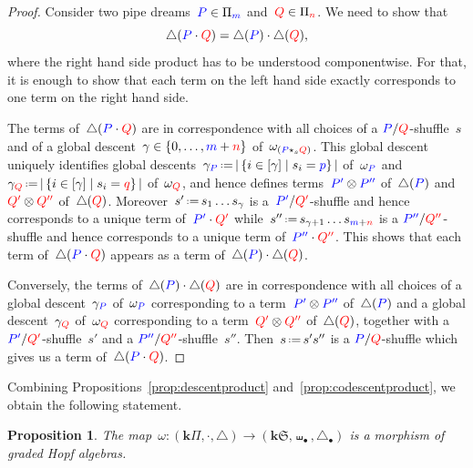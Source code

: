 \documentclass{amsart}
\newtheorem{proposition}[theorem]{Proposition}
\theoremstyle{definition}
\newcommand{\bk}{\mathbf{k}} %
\newcommand{\set}[2]{\left\{ #1 \;\middle|\; #2 \right\}} %
\newcommand{\eqdef}{\mbox{\,\raisebox{0.2ex}{\scriptsize\ensuremath{\mathrm:}}\ensuremath{=}\,}} %
\renewcommand{\b}[1]{{\color{blue} #1}} %
\renewcommand{\r}[1]{{\color{red} #1}} %
\newcommand{\fS}{\mathfrak{S}} %
\newcommand{\gdproduct}{\bullet} %
\newcommand{\gdshuffle}{\shuffle_\gdproduct} %
\newcommand{\gddeconcat}{\coproduct_\gdproduct} %
\newcommand{\HS}{{\bk\fS}} %
\newcommand{\pipeDreams}{\Pi} %
\newcommand{\HP}{{\bk\pipeDreams}} %
\newcommand{\product}{\cdot} %
\newcommand{\coproduct}{\triangle} %
\begin{document}
\begin{proof}
Consider two pipe dreams~$\b{P} \in \pipeDreams_\b{m}$ and~$\r{Q} \in \pipeDreams_\r{n}$. We need to show that
\[
\coproduct(\b{P}\product\r{Q}) = \coproduct(\b{P}) \product \coproduct(\r{Q}),
\]
where the right hand side product has to be understood componentwise. For that, it is enough to show that each term on the left hand side exactly corresponds to one term on the right hand side.

The terms of~$\coproduct(\b{P}\product\r{Q})$ are in correspondence with all choices of a $\b{P}/\r{Q}$-shuffle~$s$ and of a global descent~$\gamma \in \{0, \dots, \b{m} + \r{n}\}$ of~$\omega_{(\b{P} \star_s \r{Q})}$. This global descent uniquely identifies global descents~$\gamma_{\b{P}} \eqdef |\set{i \in [\gamma]}{s_i = \b{p}}|$ of~$\omega_\b{P}$ and~$\gamma_{\r{Q}} \eqdef |\set{i \in [\gamma]}{s_i = \r{q}}|$ of~$\omega_\r{Q}$, and hence defines terms~$\b{P'} \otimes \b{P''}$ of~$\coproduct(\b{P})$ and~$\r{Q'} \otimes \r{Q''}$ of~$\coproduct(\r{Q})$. Moreover~$s' \eqdef s_1 \dots s_\gamma$ is a~$\b{P'}/\r{Q'}$-shuffle and hence corresponds to a unique term of~$\b{P'} \product \r{Q'}$ while~$s'' \eqdef s_{\gamma + 1} \dots s_{\b{m}+\r{n}}$ is a $\b{P''}/\r{Q''}$-shuffle and hence corresponds to a unique term of~$\b{P''} \product \r{Q''}$. This shows that each term of~$\coproduct(\b{P} \product \r{Q})$ appears as a term of~$\coproduct(\b{P}) \product \coproduct(\r{Q})$.

Conversely, the terms of~$\coproduct(\b{P}) \product \coproduct(\r{Q})$ are in correspondence with all choices of a global descent~$\gamma_{\b{P}}$ of~$\omega_\b{P}$ corresponding to a term~$\b{P'} \otimes \b{P''}$ of~$\coproduct(\b{P})$ and a global descent~$\gamma_{\r{Q}}$ of~$\omega_\r{Q}$ corresponding to a term~$\r{Q'} \otimes \r{Q''}$ of~$\coproduct(\r{Q})$, together with a $\b{P'}/\r{Q'}$-shuffle~$s'$ and a $\b{P''}/\r{Q''}$-shuffle~$s''$. Then~$s \eqdef s's''$ is a $\b{P}/\r{Q}$-shuffle which gives us a term of~$\coproduct(\b{P} \product \r{Q})$.
\end{proof}

Combining Propositions~\ref{prop:descentproduct} and~\ref{prop:codescentproduct}, we obtain the following statement.

\begin{proposition}
\label{prop:descentHopf}
The map~$\omega \colon (\HP, \product, \coproduct) \to (\HS, \gdshuffle, \gddeconcat)$ is a morphism of graded Hopf algebras.
\end{proposition}
\end{document}
